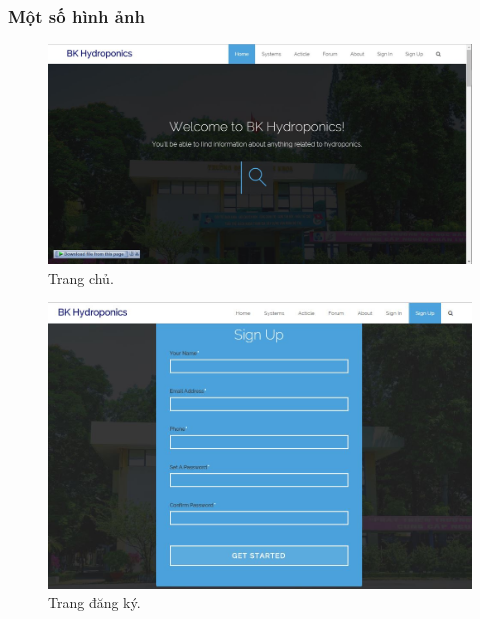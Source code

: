 \documentclass[a4paper,12pt,oneside]{article}
\begin{document}
\subsubsection{Một số hình ảnh}
\begin{center}

\begin{figure}[H]
\begin{center}
\includegraphics[scale=.4]{hinh/web_home.jpg}
\end{center}
\caption{Trang chủ.}
\end{figure}

\begin{figure}[H]
\begin{center}
\includegraphics[scale=.6]{hinh/web_register.jpg}
\end{center}
\caption{Trang đăng ký.}
\end{figure}


\end{center}
\end{document}
